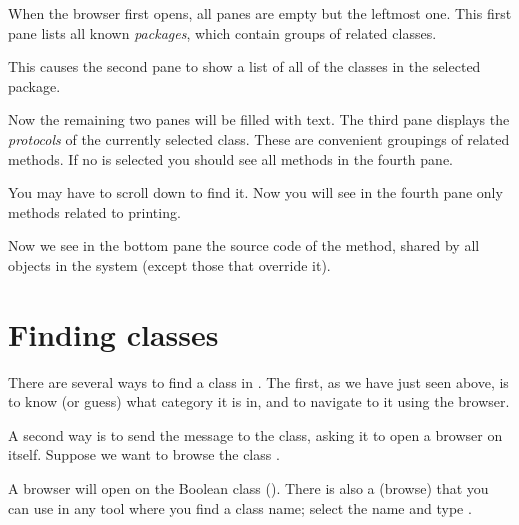 \documentclass[a4paper,10pt,twoside]{book}
\begin{document}
When the browser first opens, all panes are empty but the leftmost one.
This first pane lists all known \emph{packages}, which contain groups of related classes.

This causes the second pane to show a list of all of the classes in the selected package.

Now the remaining two panes will be filled with text.
The third pane displays the \emph{protocols} of the currently selected class.
These are convenient groupings of related methods.
If no  is selected you should see all methods in the fourth pane.


You may have to scroll down to find it.
Now you will see in the fourth pane only methods related to printing.

Now we see in the bottom pane the source code of the  method, shared by all objects in the system (except those that override it).

\section{Finding classes}

There are several ways to find a class in \pharo.  The first, as we have just seen above, is to know (or guess) what category it is in, and to navigate to it using the browser.

A second way is to send the  message to the class, asking it to open a browser on itself.  Suppose we want to browse the class .

A browser will open on the Boolean class ().
There is also a   (browse) that you can use in any tool where you find a class name;
select the name and type .

\end{document}
